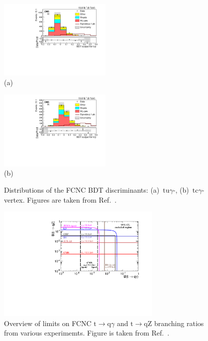 \documentclass{PoS}
\begin{document}
\begin{figure}[htbp]
\begin{center}
\parbox[t]{0.49\textwidth}{\centering\includegraphics[width=0.48\textwidth]{figures/FCNC/BDT_utg.pdf}\\(a)}
\parbox[t]{0.49\textwidth}{\centering\includegraphics[width=0.48\textwidth]{figures/FCNC/BDT_ctg.pdf}\\(b)}
\caption{Distributions of the FCNC BDT discriminants: (a)~$\mathrm{tu}\gamma$-, (b)~$\mathrm{tc}\gamma$-vertex. Figures are taken from Ref.~\cite{CMS-PAS-TOP-14-003}.}
\end{center}
\end{figure}

\begin{figure}[htbp]
\begin{center}
\includegraphics[width=0.7\textwidth]{figures/limits.pdf}
\caption{Overview of limits on FCNC $\mathrm{t}\to\mathrm{q}\gamma$ and $\mathrm{t}\to\mathrm{qZ}$ branching ratios from various experimemts. Figure is taken from Ref.~\cite{CMS-PAS-TOP-14-003}.}
\end{center}
\end{figure}
\end{document}
